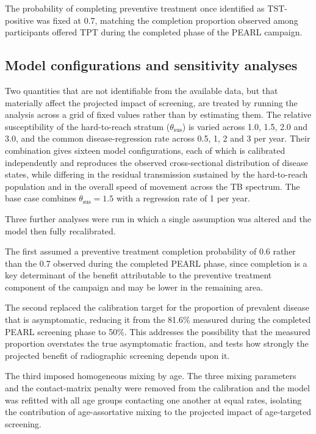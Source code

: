 The probability of completing preventive treatment once identified as TST-positive was fixed at 0.7, matching the completion proportion observed among participants offered TPT during the completed phase of the PEARL campaign.


\subsection{Model configurations and sensitivity analyses}
\label{sec:configs}

Two quantities that are not identifiable from the available data, but that materially affect the projected impact of screening, are treated by running the analysis across a grid of fixed values rather than by estimating them. The relative susceptibility of the hard-to-reach stratum (\(\theta_{\mathrm{sus}}\)) is varied across 1.0, 1.5, 2.0 and 3.0, and the common disease-regression rate across 0.5, 1, 2 and 3 per year. Their combination gives sixteen model configurations, each of which is calibrated independently and reproduces the observed cross-sectional distribution of disease states, while differing in the residual transmission sustained by the hard-to-reach population and in the overall speed of movement across the TB spectrum. The base case combines \(\theta_{\mathrm{sus}} = 1.5\) with a regression rate of 1 per year.

Three further analyses were run in which a single assumption was altered and the model then fully recalibrated.

The first assumed a preventive treatment completion probability of 0.6 rather than the 0.7 observed during the completed PEARL phase, since completion is a key determinant of the benefit attributable to the preventive treatment component of the campaign and may be lower in the remaining area.

The second replaced the calibration target for the proportion of prevalent disease that is asymptomatic, reducing it from the 81.6\% measured during the completed PEARL screening phase to 50\%. This addresses the possibility that the measured proportion overstates the true asymptomatic fraction, and tests how strongly the projected benefit of radiographic screening depends upon it.

The third imposed homogeneous mixing by age. The three mixing parameters and the contact-matrix penalty were removed from the calibration and the model was refitted with all age groups contacting one another at equal rates, isolating the contribution of age-assortative mixing to the projected impact of age-targeted screening.
